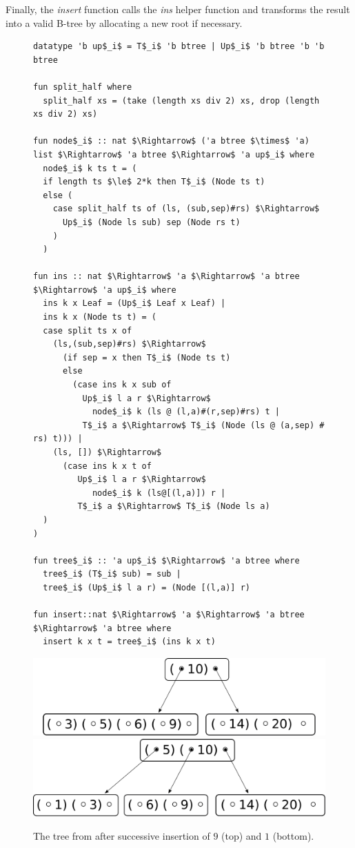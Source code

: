 Finally, the \textit{insert} function calls the \textit{ins} helper function
and transforms the result into a valid B-tree by allocating a new root if necessary.

\begin{figure}
    
\begin{lstlisting}[mathescape=true, language=Isabelle, label=lst:ins-fun, caption={
    The \textit{insert} function
}]
datatype 'b up$_i$ = T$_i$ 'b btree | Up$_i$ 'b btree 'b 'b btree

fun split_half where
  split_half xs = (take (length xs div 2) xs, drop (length xs div 2) xs)

fun node$_i$ :: nat $\Rightarrow$ ('a btree $\times$ 'a) list $\Rightarrow$ 'a btree $\Rightarrow$ 'a up$_i$ where
  node$_i$ k ts t = (
  if length ts $\le$ 2*k then T$_i$ (Node ts t)
  else (
    case split_half ts of (ls, (sub,sep)#rs) $\Rightarrow$
      Up$_i$ (Node ls sub) sep (Node rs t)
    )
  )

fun ins :: nat $\Rightarrow$ 'a $\Rightarrow$ 'a btree $\Rightarrow$ 'a up$_i$ where
  ins k x Leaf = (Up$_i$ Leaf x Leaf) |
  ins k x (Node ts t) = (
  case split ts x of
    (ls,(sub,sep)#rs) $\Rightarrow$ 
      (if sep = x then T$_i$ (Node ts t)
      else
        (case ins k x sub of 
          Up$_i$ l a r $\Rightarrow$
            node$_i$ k (ls @ (l,a)#(r,sep)#rs) t | 
          T$_i$ a $\Rightarrow$ T$_i$ (Node (ls @ (a,sep) # rs) t))) |
    (ls, []) $\Rightarrow$
      (case ins k x t of
         Up$_i$ l a r $\Rightarrow$
            node$_i$ k (ls@[(l,a)]) r |
         T$_i$ a $\Rightarrow$ T$_i$ (Node ls a)
  )
)

fun tree$_i$ :: 'a up$_i$ $\Rightarrow$ 'a btree where
  tree$_i$ (T$_i$ sub) = sub |
  tree$_i$ (Up$_i$ l a r) = (Node [(l,a)] r)

fun insert::nat $\Rightarrow$ 'a $\Rightarrow$ 'a btree $\Rightarrow$ 'a btree where
  insert k x t = tree$_i$ (ins k x t)
\end{lstlisting}

\end{figure}

\begin{figure}
    \centering
    \includegraphics[width=0.48\linewidth]{figures/btree-basic-ins9.pdf}\\
    \vspace*{1cm}
    \includegraphics[width=0.48\linewidth]{figures/btree-basic-ins9-ins1.pdf}
    \caption[An example B-Tree after two insertion operations]
    {The tree from  after 
    successive insertion of $9$ (top) and $1$ (bottom).}
    \label{fig:btree-basic-ins}
\end{figure}

